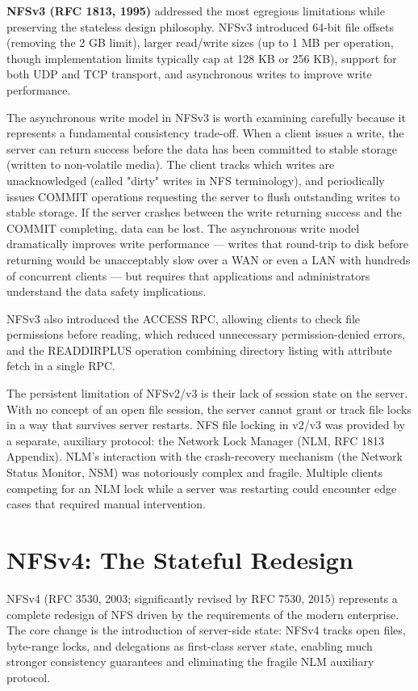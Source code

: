 \textbf{NFSv3 (RFC 1813, 1995)} addressed the most egregious limitations while preserving the stateless design philosophy. NFSv3 introduced 64-bit file offsets (removing the 2 GB limit), larger read/write sizes (up to 1 MB per operation, though implementation limits typically cap at 128 KB or 256 KB), support for both UDP and TCP transport, and asynchronous writes to improve write performance.

The asynchronous write model in NFSv3 is worth examining carefully because it represents a fundamental consistency trade-off. When a client issues a write, the server can return success before the data has been committed to stable storage (written to non-volatile media). The client tracks which writes are unacknowledged (called "dirty" writes in NFS terminology), and periodically issues COMMIT operations requesting the server to flush outstanding writes to stable storage. If the server crashes between the write returning success and the COMMIT completing, data can be lost. The asynchronous write model dramatically improves write performance --- writes that round-trip to disk before returning would be unacceptably slow over a WAN or even a LAN with hundreds of concurrent clients --- but requires that applications and administrators understand the data safety implications.

NFSv3 also introduced the ACCESS RPC, allowing clients to check file permissions before reading, which reduced unnecessary permission-denied errors, and the READDIRPLUS operation combining directory listing with attribute fetch in a single RPC.

The persistent limitation of NFSv2/v3 is their lack of session state on the server. With no concept of an open file session, the server cannot grant or track file locks in a way that survives server restarts. NFS file locking in v2/v3 was provided by a separate, auxiliary protocol: the Network Lock Manager (NLM, RFC 1813 Appendix). NLM's interaction with the crash-recovery mechanism (the Network Status Monitor, NSM) was notoriously complex and fragile. Multiple clients competing for an NLM lock while a server was restarting could encounter edge cases that required manual intervention.

\section{NFSv4: The Stateful Redesign}
NFSv4 (RFC 3530, 2003; significantly revised by RFC 7530, 2015) represents a complete redesign of NFS driven by the requirements of the modern enterprise. The core change is the introduction of server-side state: NFSv4 tracks open files, byte-range locks, and delegations as first-class server state, enabling much stronger consistency guarantees and eliminating the fragile NLM auxiliary protocol.

